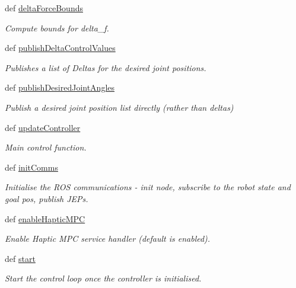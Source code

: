 \begin{DoxyCompactItemize}
def \hyperlink{classhrl__haptic__mpc_1_1haptic__mpc_1_1_haptic_m_p_c_a3aa1f233ea3d0915b62501d55a26f10e}{delta\-Force\-Bounds}
\begin{DoxyCompactList}\small\item\em \-Compute bounds for delta\-\_\-f. \end{DoxyCompactList}\item 
def \hyperlink{classhrl__haptic__mpc_1_1haptic__mpc_1_1_haptic_m_p_c_a550b52f1b8a8f1d69b0100481d60b12b}{publish\-Delta\-Control\-Values}
\begin{DoxyCompactList}\small\item\em \-Publishes a list of \-Deltas for the desired joint positions. \end{DoxyCompactList}\item 
def \hyperlink{classhrl__haptic__mpc_1_1haptic__mpc_1_1_haptic_m_p_c_af927232af3751007b9a3203e0657b26f}{publish\-Desired\-Joint\-Angles}
\begin{DoxyCompactList}\small\item\em \-Publish a desired joint position list directly (rather than deltas) \end{DoxyCompactList}\item 
def \hyperlink{classhrl__haptic__mpc_1_1haptic__mpc_1_1_haptic_m_p_c_a603f9f9718cf153ea0d25b2946c0b4ec}{update\-Controller}
\begin{DoxyCompactList}\small\item\em \-Main control function. \end{DoxyCompactList}\item 
\hypertarget{classhrl__haptic__mpc_1_1haptic__mpc_1_1_haptic_m_p_c_afefd8dfa85c11b3d6b2339543a41fd33}{def \hyperlink{classhrl__haptic__mpc_1_1haptic__mpc_1_1_haptic_m_p_c_afefd8dfa85c11b3d6b2339543a41fd33}{init\-Comms}}\label{classhrl__haptic__mpc_1_1haptic__mpc_1_1_haptic_m_p_c_afefd8dfa85c11b3d6b2339543a41fd33}

\begin{DoxyCompactList}\small\item\em \-Initialise the \-R\-O\-S communications -\/ init node, subscribe to the robot state and goal pos, publish \-J\-E\-Ps. \end{DoxyCompactList}\item 
def \hyperlink{classhrl__haptic__mpc_1_1haptic__mpc_1_1_haptic_m_p_c_a9d2ed31d5403631abbc15d83c34989ec}{enable\-Haptic\-M\-P\-C}
\begin{DoxyCompactList}\small\item\em \-Enable \-Haptic \-M\-P\-C service handler (default is enabled). \end{DoxyCompactList}\item 
def \hyperlink{classhrl__haptic__mpc_1_1haptic__mpc_1_1_haptic_m_p_c_a7f2da0f4de0bf8b7fdb8970e24b6f3d1}{start}
\begin{DoxyCompactList}\small\item\em \-Start the control loop once the controller is initialised. \end{DoxyCompactList}\end{DoxyCompactItemize}
